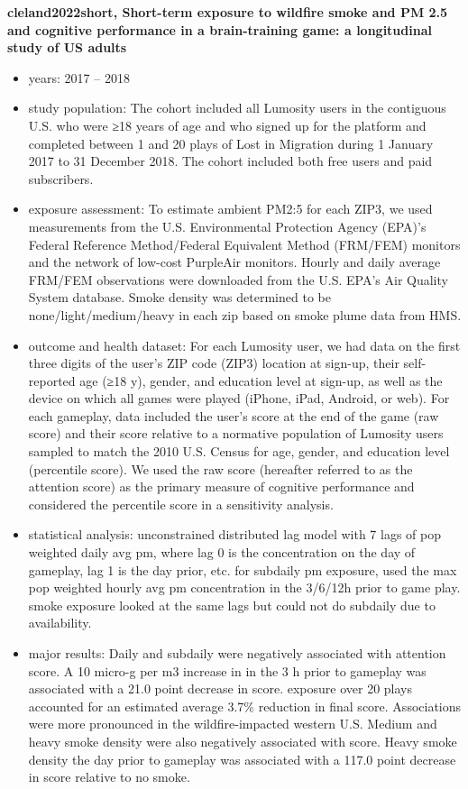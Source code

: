 \textbf{cleland2022short, Short-term exposure to wildfire smoke and PM 2.5 and cognitive performance in a brain-training game: a longitudinal study of US adults}
\begin{itemize}
    \item years: 2017 -- 2018 
    \item study population: The cohort included all Lumosity users in the contiguous U.S. who were ≥18 years of age and who signed up for the platform and completed between 1 and 20 plays of Lost in Migration during 1 January 2017 to 31 December 2018. The cohort included both free users and paid subscribers.
    \item exposure assessment: To estimate ambient PM2:5 for each ZIP3, we used measurements from the U.S. Environmental Protection Agency (EPA)’s Federal Reference Method/Federal Equivalent Method (FRM/FEM) monitors and the network of low-cost PurpleAir monitors. Hourly and daily average FRM/FEM observations were downloaded from the U.S. EPA’s Air Quality System database. Smoke density was determined to be none/light/medium/heavy in each zip based on smoke plume data from HMS. 
    \item outcome and health dataset: For each Lumosity user, we had data on the first three digits of the user’s ZIP code (ZIP3) location at sign-up, their self-reported age (≥18 y), gender, and education level at sign-up, as well as the device on which all games were played (iPhone, iPad, Android, or web). For each gameplay, data included the user’s score at the end of the game (raw score) and their score relative to a normative population of Lumosity users sampled to match the 2010 U.S. Census for age, gender, and education level (percentile score). We used the raw score (hereafter referred to as the attention score) as the primary measure of cognitive performance and considered the percentile score in a sensitivity analysis.
    \item statistical analysis: unconstrained distributed lag model with 7 lags of pop weighted daily avg pm, where lag 0 is the concentration on the day of gameplay, lag 1 is the day prior, etc. for subdaily pm exposure, used the max pop weighted hourly avg pm concentration in the 3/6/12h prior to game play. smoke exposure looked at the same lags but could not do subdaily due to availability. 
    \item major results: Daily and subdaily \PM were negatively associated with attention score. A 10 micro-g per m3 increase in \PM in the 3 h prior to gameplay was associated with a 21.0 point decrease in score. \PM exposure over 20 plays accounted for an estimated average 3.7\% reduction in final score. Associations were more pronounced in the wildfire-impacted western U.S. Medium and heavy smoke density were also negatively associated with score. Heavy smoke density the day prior to gameplay was associated with a 117.0 point decrease in score relative to no smoke.
\end{itemize}

